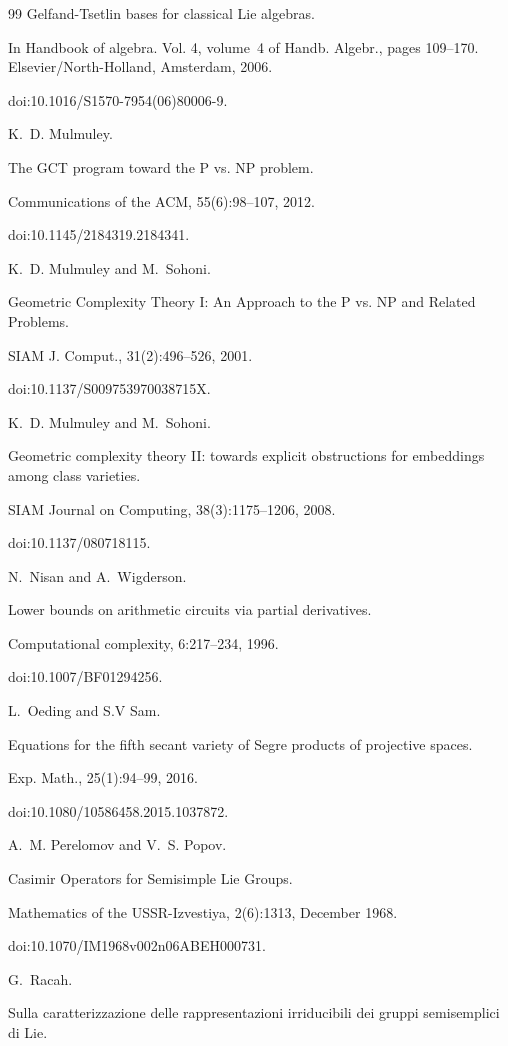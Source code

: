 \documentclass[10pt,a4paper]{article}
\begin{document}
\begin{thebibliography}{99}
Gelfand-Tsetlin bases for classical Lie algebras.


In Handbook of algebra. Vol. 4, volume 4 of Handb.
Algebr., pages 109–170. Elsevier/North-Holland, Amsterdam, 2006.


doi:10.1016/S1570-7954(06)80006-9.

K. D. Mulmuley.


The GCT program toward the P vs. NP problem.


Communications of the ACM, 55(6):98–107, 2012.


doi:10.1145/2184319.2184341.

K. D. Mulmuley and M. Sohoni.


Geometric Complexity Theory I: An Approach to the P vs. NP and
Related Problems.


SIAM J. Comput., 31(2):496–526, 2001.


doi:10.1137/S009753970038715X.

K. D. Mulmuley and M. Sohoni.


Geometric complexity theory II: towards explicit obstructions for
embeddings among class varieties.


SIAM Journal on Computing, 38(3):1175–1206, 2008.


doi:10.1137/080718115.

N. Nisan and A. Wigderson.


Lower bounds on arithmetic circuits via partial derivatives.


Computational complexity, 6:217–234, 1996.


doi:10.1007/BF01294256.

L. Oeding and S.V Sam.


Equations for the fifth secant variety of Segre products of
projective spaces.


Exp. Math., 25(1):94–99, 2016.


doi:10.1080/10586458.2015.1037872.

A. M. Perelomov and V. S. Popov.


Casimir Operators for Semisimple Lie Groups.


Mathematics of the USSR-Izvestiya, 2(6):1313, December 1968.


doi:10.1070/IM1968v002n06ABEH000731.

G. Racah.


Sulla caratterizzazione delle rappresentazioni irriducibili dei
gruppi semisemplici di Lie.



\end{thebibliography}
\end{document}
